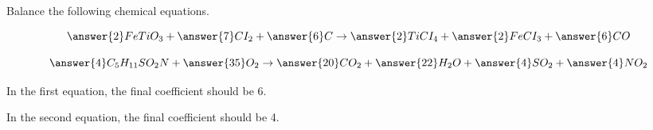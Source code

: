 \documentclass{ximera}
\author{Zack Reed}
\begin{document}
\begin{problem}

Balance the following chemical equations. 



$$\answer{2} FeTiO_3+\answer{7} CI_2+\answer{6} C\rightarrow \answer{2} TiCI_4+\answer{2} FeCI_3+\answer{6} CO$$

    
    
$$\answer{4} C_5H_{11} SO_2N+\answer{35} O_2\rightarrow \answer{20} CO_2+\answer{22} H_2O+\answer{4} SO_2+\answer{4} NO_2$$

In the first equation, the final coefficient should be 6. 

In the second equation, the final coefficient should be 4.

\end{problem}
\end{document}
